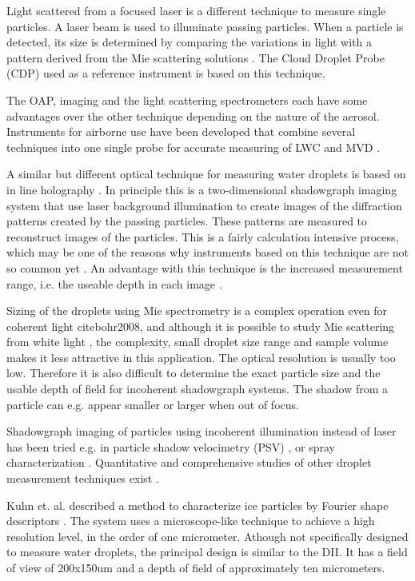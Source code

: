 Light scattered from a focused laser \cite{baum1983,dye1984} is a different technique to measure single particles. A laser beam is used to illuminate passing particles. When a particle is detected, its size is determined by comparing the variations in light with a pattern derived from the Mie scattering solutions \cite{mie1908}. The Cloud Droplet Probe (CDP) used as a reference instrument is based on this technique.

The OAP, imaging and the light scattering spectrometers each have some advantages over the other technique depending on the nature of the aerosol. Instruments for airborne use have been developed that combine several techniques into one single probe for accurate measuring of LWC and MVD \cite{baum2001, baum2011}.

A similar but different optical technique for measuring water droplets is based on in line holography \cite{laws1995}. In principle this is a two-dimensional shadowgraph imaging system that use laser background illumination to create images of the diffraction patterns created by the passing particles. These patterns are measured to reconstruct images of the particles. This is a fairly calculation intensive process, which may be one of the reasons why instruments based on this technique are not so common yet \cite{henn2013}. An advantage with this technique is the increased measurement range, i.e. the useable depth in each image \cite{kaikk2014}.

Sizing of the droplets using Mie spectrometry is a complex operation even for coherent light cite{bohr2008}, and although it is possible to study Mie scattering from white light \cite{ward2008}, the complexity, small droplet size range and sample volume makes it less attractive in this application. The optical resolution is usually too low. Therefore it is also difficult to determine the exact particle size and the usable depth of field for incoherent shadowgraph systems. The shadow from a particle can e.g. appear smaller or larger when out of focus.

Shadowgraph imaging of particles using incoherent illumination instead of laser has been tried e.g. in particle shadow velocimetry (PSV) \cite{este2005}, or spray characterization \cite{will2010}. Quantitative and comprehensive studies of other droplet measurement techniques exist \cite{dye1984,henn2013,conno2007}.

Kuhn et. al. \cite{kuhn2012} described a method to characterize ice particles by Fourier shape descriptors \cite{gran1972,walla1980}. The system uses a microscope-like technique to achieve a high resolution level, in the order of one micrometer. Athough not specifically designed to measure water droplets, the principal design is similar to the DII. It has a field of view of 200x150um and a depth of field of approximately ten micrometers.



